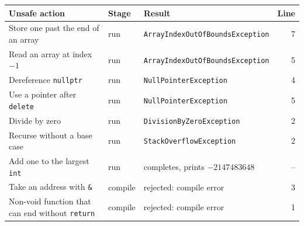 \begin{tabular}{p{5.6cm}lp{5.6cm}r}
\toprule
Unsafe action & Stage & Result & Line \\
\midrule
Store one past the end of an array & run & \texttt{ArrayIndexOutOfBoundsException} & 7 \\
Read an array at index $-1$ & run & \texttt{ArrayIndexOutOfBoundsException} & 5 \\
Dereference \texttt{nullptr} & run & \texttt{NullPointerException} & 4 \\
Use a pointer after \texttt{delete} & run & \texttt{NullPointerException} & 5 \\
Divide by zero & run & \texttt{DivisionByZeroException} & 2 \\
Recurse without a base case & run & \texttt{StackOverflowException} & 2 \\
Add one to the largest \texttt{int} & run & completes, prints $-2147483648$ & -- \\
Take an address with \texttt{\&} & compile & rejected: compile error & 3 \\
Non-void function that can end without \texttt{return} & compile & rejected: compile error & 1 \\
\bottomrule
\end{tabular}
